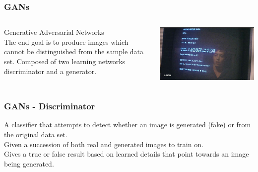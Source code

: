 \documentclass{beamer}
\begin{document}
     \begin{frame}
        \frametitle{GANs}
               \begin{columns}
            \begin{column}{0.6\textwidth}
                \vspace{0.2in}
                Generative Adversarial Networks \\
                \vspace{0.2in}
                The end goal is to produce images which cannot be distinguished from the sample data set. Composed of two learning networks discriminator and a generator.\\
            \end{column}
            \begin{column}{0.4\textwidth}
                \vspace{0.2in}
                \includegraphics[scale=.3]{images/wargames-terminal.jpg}
                \begin{center}
                \end{center}
            \end{column}
        \end{columns}
    \end{frame}

     \begin{frame}
        \frametitle{GANs - Discriminator}
        A classifier that attempts to detect whether an image is generated (fake) or from the original data set. \\
        \vspace{0.2in}
        Given a succession of both real and generated images to train on.\\
        \vspace{0.2in}
        Gives a true or false result based on learned details that point towards an image being generated.
    \end{frame}
\end{document}
